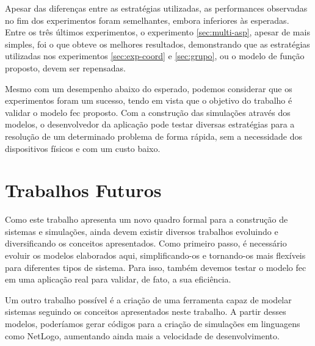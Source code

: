     Apesar das diferenças entre as estratégias utilizadas, as performances observadas no fim dos experimentos foram semelhantes, embora inferiores às esperadas. Entre os três últimos experimentos, o experimento \ref{sec:multi-asp}, apesar de mais simples, foi o que obteve os melhores resultados, demonstrando que as estratégias utilizadas nos experimentos \ref{sec:exp-coord} e \ref{sec:grupo}, ou o modelo de função proposto, devem ser repensadas. 
    
    Mesmo com um desempenho abaixo do esperado, podemos considerar que os experimentos foram um sucesso, tendo em vista que o objetivo do trabalho é validar o modelo \acrshort{fec} proposto. Com a construção das simulações através dos modelos, o desenvolvedor da aplicação pode testar diversas estratégias para a resolução de um determinado problema de forma rápida, sem a necessidade dos dispositivos físicos e com um custo baixo.
    
    \section{Trabalhos Futuros}
    Como este trabalho apresenta um novo quadro formal para a construção de sistemas e simulações, ainda devem existir diversos trabalhos evoluindo e diversificando os conceitos apresentados. Como primeiro passo, é necessário evoluir os modelos elaborados aqui, simplificando-os e tornando-os mais flexíveis para diferentes tipos de sistema. Para isso, também devemos testar o modelo \acrshort{fec} em uma aplicação real para validar, de fato, a sua eficiência. 
    
    Um outro trabalho possível é a criação de uma ferramenta capaz de modelar sistemas seguindo os conceitos apresentados neste trabalho. A partir desses modelos, poderíamos gerar códigos para a criação de simulações em linguagens como NetLogo, aumentando ainda mais a velocidade de desenvolvimento. 
    